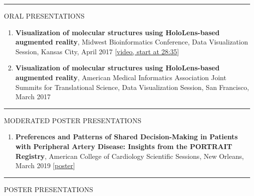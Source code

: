 \documentclass[
]{article}
\providecommand{\tightlist}{%
  \setlength{\itemsep}{0pt}\setlength{\parskip}{0pt}}
\begin{document}
\begin{center}\rule{0.5\linewidth}{0.5pt}\end{center}

ORAL PRESENTATIONS

\begin{enumerate}
\def\labelenumi{\arabic{enumi}.}
\item
  \textbf{Visualization of molecular structures using HoloLens-based
  augmented reality}, Midwest Bioinformatics Conference, Data
  Visualization Session, Kansas City, April 2017
  {[}\href{https://vimeo.com/217083333}{video, start at 28:35}{]}
\item
  \textbf{Visualization of molecular structures using HoloLens-based
  augmented reality}, American Medical Informatics Association Joint
  Summits for Translational Science, Data Visualization Session, San
  Francisco, March 2017
\end{enumerate}

\begin{center}\rule{0.5\linewidth}{0.5pt}\end{center}

MODERATED POSTER PRESENTATIONS

\begin{enumerate}
\def\labelenumi{\arabic{enumi}.}
\tightlist
\item
  \textbf{Preferences and Patterns of Shared Decision-Making in Patients
  with Peripheral Artery Disease: Insights from the PORTRAIT Registry},
  American College of Cardiology Scientific Sessions, New Orleans, March
  2019
  {[}\href{https://jeremyprovance.github.io/assets/2019-03-16_Poster.pdf}{poster}{]}
\end{enumerate}

\begin{center}\rule{0.5\linewidth}{0.5pt}\end{center}

POSTER PRESENTATIONS
\end{document}
